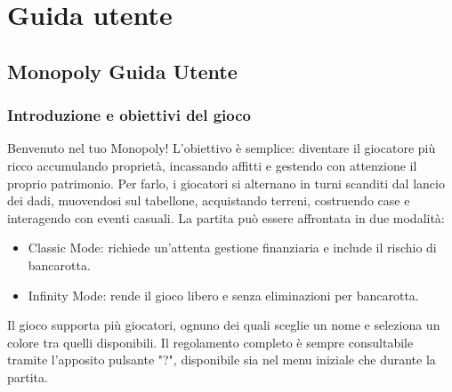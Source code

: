 \appendix
\chapter{Guida utente}
\section{Monopoly \- Guida Utente}
\subsection{Introduzione e obiettivi del gioco}
Benvenuto nel tuo Monopoly!\newline
L’obiettivo è semplice: diventare il giocatore più ricco accumulando proprietà, incassando affitti e gestendo con attenzione il proprio patrimonio.
Per farlo, i giocatori si alternano in turni scanditi dal lancio dei dadi, muovendosi sul tabellone, acquistando terreni, costruendo case e interagendo con eventi casuali.\newline
La partita può essere affrontata in due modalità:\newline
\begin{itemize}
    \item Classic Mode: richiede un'attenta gestione finanziaria e include il rischio di bancarotta.
    \item Infinity Mode: rende il gioco libero e senza eliminazioni per bancarotta.  
\end{itemize}
Il gioco supporta più giocatori, ognuno dei quali sceglie un nome e seleziona un colore tra quelli disponibili.
Il regolamento completo è sempre consultabile tramite l’apposito pulsante "?", disponibile sia nel menu iniziale che durante la partita.
